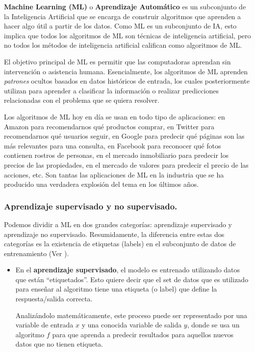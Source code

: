 \documentclass[12pt,a4paper]{article}
\begin{document}
\begin{sloppypar}
\textbf{Machine Learning (ML)} o \textbf{Aprendizaje Automático} es un subconjunto de la Inteligencia Artificial que se encarga de construir algoritmos que aprenden a hacer algo útil a partir de los datos. 
Como ML es un subconjunto de IA, esto implica que todos los algoritmos de ML son técnicas de inteligencia artificial, pero no todos los métodos de inteligencia artificial califican como algoritmos de ML.

El objetivo principal de ML es permitir que las computadoras aprendan sin intervención o asistencia humana.
Esencialmente, los algoritmos de ML aprenden \textit{patrones} ocultos basados en datos históricos de entrada, los cuales posteriormente utilizan para aprender a clasificar la información o realizar predicciones relacionadas con el problema que se quiera resolver. 

Los algoritmos de ML hoy en día se usan en todo tipo de aplicaciones: en Amazon para recomendarnos qué productos comprar, en Twitter para recomendarnos qué usuarios seguir, en Google para predecir qué páginas son las más relevantes para una consulta, en Facebook para reconocer qué fotos contienen rostros de personas, en el mercado inmobiliario para predecir los precios de las propiedades, en el mercado de valores para predecir el precio de las acciones, etc. Son tantas las aplicaciones de ML en la industria que se ha producido una verdadera explosión del tema en los últimos años\cite{apunte_uba}.

\cleardoublepage
\subsubsection{Aprendizaje supervisado y no supervisado.}

Podemos dividir a ML en dos grandes categorías: aprendizaje supervisado y aprendizaje no supervisado. Resumidamente, la diferencia entre estas dos categorías es la existencia de etiquetas (labels) en el subconjunto de datos de entrenamiento (Ver \textit{}).

\begin{itemize}
\item En el \textbf{aprendizaje supervisado}, el modelo es entrenado utilizando datos que están “etiquetados”. Esto quiere decir que el set de datos que es utilizado para enseñar al algoritmo tiene una etiqueta (o label) que define la respuesta/salida correcta. 

Analizándolo matemáticamente, este proceso puede ser representado por una variable de entrada $x$ y una conocida variable de salida $y$, donde se usa un algoritmo $f$ para que aprenda a predecir resultados para aquellos nuevos datos que no tienen etiqueta.


\end{itemize}
\end{sloppypar}
\end{document}

